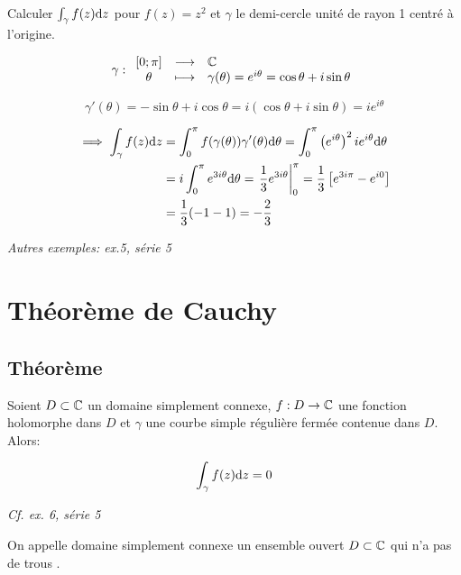 \begin{example}
    Calculer $\int_\gamma f(z) \mathrm{d}z$ pour $f(z) = z^2$ et $\gamma$ le demi-cercle unité de rayon 1 centré à l'origine.
    
    \[
    \gamma:
    \begin{array}{ccl}
    [0;\pi] & \longrightarrow & \mathbb{C} \\
    \theta & \longmapsto & \gamma(\theta) = e^{i\theta} = \cos \theta + i \sin \theta
    \end{array}
    \]
    
    \[
    \gamma'(\theta) = -\sin \theta + i \cos \theta = i(\cos \theta + i \sin \theta) = i e^{i\theta}
    \]
    
    \begin{align*}
    \implies \int_\gamma f(z) \mathrm{d}z &= \int_0^\pi f(\gamma(\theta)) \gamma'(\theta) \mathrm{d}\theta = \int_0^\pi \left(e^{i\theta}\right)^2 i e^{i\theta} \mathrm{d}\theta
    \\&=
    i \int_0^\pi e^{3i\theta} \mathrm{d}\theta = \left.\frac{1}{3} e^{3i\theta} \right|_0^\pi = \frac{1}{3} \left[e^{3i\pi} - e^{i0}\right]
    \\&=
    \frac{1}{3} (-1-1) = -\frac{2}{3}
    \end{align*}
    
    \textit{Autres exemples: ex.5, série 5}
\end{example}


\section{Théorème de Cauchy}

\subsection{Théorème}

\begin{theorem}[10.2, p.73]
    Soient $D \subset \mathbb{C}$ un domaine simplement connexe, $f: D \rightarrow \mathbb{C}$ une fonction holomorphe dans $D$ et $\gamma$ une courbe simple régulière fermée contenue dans $D$.
    Alors:
    
    \[\int_\gamma f(z) \mathrm{d}z = 0\]
    
    \textit{Cf. ex. 6, série 5}
\end{theorem}

\begin{terminology}
    On appelle domaine simplement connexe un ensemble ouvert $D \subset \mathbb{C}$ qui \og n'a pas de trous \fg{}.
\end{terminology}

